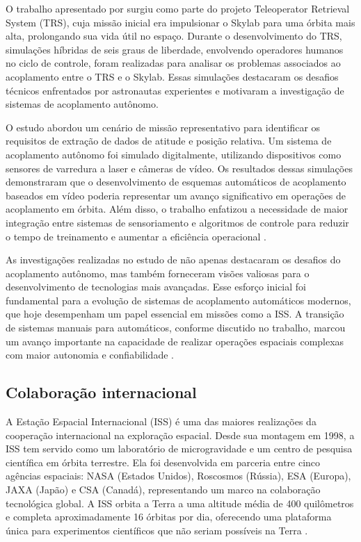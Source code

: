 O trabalho apresentado por \cite{micheal1981} surgiu como parte do projeto Teleoperator Retrieval System (TRS), cuja missão inicial era impulsionar o Skylab para uma órbita mais alta, prolongando sua vida útil no espaço. Durante o desenvolvimento do TRS, simulações híbridas de seis graus de liberdade, envolvendo operadores humanos no ciclo de controle, foram realizadas para analisar os problemas associados ao acoplamento entre o TRS e o Skylab. Essas simulações destacaram os desafios técnicos enfrentados por astronautas experientes e motivaram a investigação de sistemas de acoplamento autônomo.

O estudo abordou um cenário de missão representativo para identificar os requisitos de extração de dados de atitude e posição relativa. Um sistema de acoplamento autônomo foi simulado digitalmente, utilizando dispositivos como sensores de varredura a laser e câmeras de vídeo. Os resultados dessas simulações demonstraram que o desenvolvimento de esquemas automáticos de acoplamento baseados em vídeo poderia representar um avanço significativo em operações de acoplamento em órbita. Além disso, o trabalho enfatizou a necessidade de maior integração entre sistemas de sensoriamento e algoritmos de controle para reduzir o tempo de treinamento e aumentar a eficiência operacional \cite{micheal1981}.

As investigações realizadas no estudo de \cite{micheal1981} não apenas destacaram os desafios do acoplamento autônomo, mas também forneceram visões valiosas para o desenvolvimento de tecnologias mais avançadas. Esse esforço inicial foi fundamental para a evolução de sistemas de acoplamento automáticos modernos, que hoje desempenham um papel essencial em missões como a ISS. A transição de sistemas manuais para automáticos, conforme discutido no trabalho, marcou um avanço importante na capacidade de realizar operações espaciais complexas com maior autonomia e confiabilidade \cite{micheal1981}.

\subsection{Colaboração internacional}

A Estação Espacial Internacional (ISS) é uma das maiores realizações da cooperação internacional na exploração espacial. Desde sua montagem em 1998, a ISS tem servido como um laboratório de microgravidade e um centro de pesquisa científica em órbita terrestre. Ela foi desenvolvida em parceria entre cinco agências espaciais: NASA (Estados Unidos), Roscosmos (Rússia), ESA (Europa), JAXA (Japão) e CSA (Canadá), representando um marco na colaboração tecnológica global. A ISS orbita a Terra a uma altitude média de 400 quilômetros e completa aproximadamente 16 órbitas por dia, oferecendo uma plataforma única para experimentos científicos que não seriam possíveis na Terra \cite{nasaISS}.

